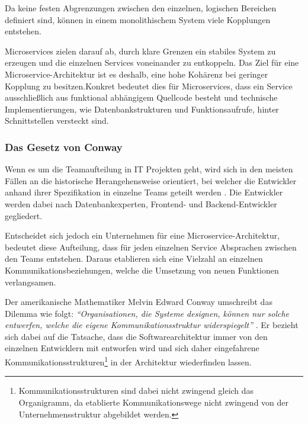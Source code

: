 Da keine festen Abgrenzungen zwischen den einzelnen, logischen Bereichen definiert sind, können in einem monolithischem System viele Kopplungen entstehen.

Microservices zielen darauf ab, durch klare Grenzen ein stabiles System zu erzeugen und die einzelnen Services voneinander zu entkoppeln. Das Ziel für eine Microservice-Architektur ist es deshalb, eine hohe Kohärenz bei geringer Kopplung zu besitzen.\footnotemark Konkret bedeutet dies für Microservices, dass ein Service ausschließlich aus funktional abhängigem Quellcode besteht und technische Implementierungen, wie Datenbankstrukturen und Funktionsaufrufe, hinter Schnittstellen versteckt sind.


\subsubsection{Das Gesetz von Conway}
\label{sec:conway}

Wenn es um die Teamaufteilung in IT Projekten geht, wird sich in den meisten Fällen an die historische Herangehensweise orientiert, bei welcher die Entwickler anhand ihrer Spezifikation in einzelne Teams geteilt werden \parencite[vgl.][Kap. 4.2]{wolff_microservices_2018}.  Die Entwickler werden dabei nach Datenbankexperten, Frontend- und Backend-Entwickler gegliedert.

Entscheidet sich jedoch ein Unternehmen für eine Microservice-Architektur, bedeutet diese Aufteilung, dass für jeden einzelnen Service Absprachen zwischen den Teams entstehen. Daraus etablieren sich eine Vielzahl an einzelnen Kommunikationsbeziehungen, welche die Umsetzung von neuen Funktionen verlangsamen.

Der amerikanische Mathematiker Melvin Edward Conway umschreibt das Dilemma wie folgt:
\textit{\enquote{Organisationen, die Systeme designen, können nur solche entwerfen, welche die eigene Kommunikationsstruktur widerspiegelt}} \parencite{conway_conways_1968}.
Er bezieht sich dabei auf die Tatsache, dass die Softwarearchitektur immer von den einzelnen Entwicklern mit entworfen wird und sich daher eingefahrene Kommunikationsstrukturen\footnote{Kommunikationsstrukturen sind dabei nicht zwingend gleich das Organigramm, da etablierte Kommunikationswege nicht zwingend von der Unternehmensstruktur abgebildet werden.} in der Architektur wiederfinden lassen.

